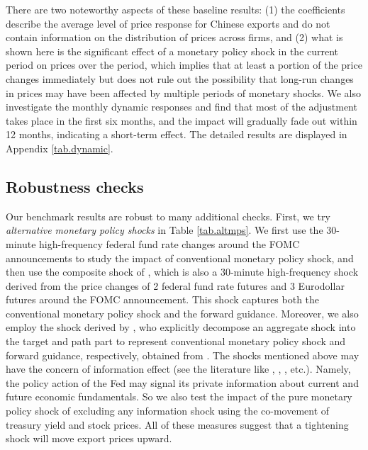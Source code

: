 There are two noteworthy aspects of these baseline results: (1) the coefficients describe the average level of price response for Chinese exports and do not contain information on the distribution of prices across firms, and (2) what is shown here is the significant effect of a monetary policy shock in the current period on prices over the period, which implies that at least a portion of the price changes immediately but does not rule out the possibility that long-run changes in prices may have been affected by multiple periods of monetary shocks. We also investigate the monthly dynamic responses and find that most of the adjustment takes place in the first six months, and the impact will gradually fade out within 12 months, indicating a short-term effect. The detailed results are displayed in Appendix \ref{tab.dynamic}.

\subsection{Robustness checks}

Our benchmark results are robust to many additional checks. First, we try \textit{alternative monetary policy shocks} in Table \ref{tab.altmps}. We first use the 30-minute high-frequency federal fund rate changes around the FOMC announcements to study the impact of conventional monetary policy shock, and then use the composite shock of \cite{nakamura2018high}, which is also a 30-minute high-frequency shock derived from the price changes of 2 federal fund rate futures and 3 Eurodollar futures around the FOMC announcement. This shock captures both the conventional monetary policy shock and the forward guidance. Moreover, we also employ the shock derived by \cite{guraynak2005actions}, who explicitly decompose an aggregate shock into the target and path part to represent conventional monetary policy shock and forward guidance, respectively, obtained from \cite{acosta2022perceived}. The shocks mentioned above may have the concern of information effect (see the literature like \cite{nakamura2018high}, \cite{jarocinski2020deconstructing}, \cite{acosta2022perceived}, etc.). Namely, the policy action of the Fed may signal its private information about current and future economic fundamentals. So we also test the impact of the pure monetary policy shock of \cite{jarocinski2020deconstructing} excluding any information shock using the co-movement of treasury yield and stock prices. All of these measures suggest that a tightening shock will move export prices upward.

